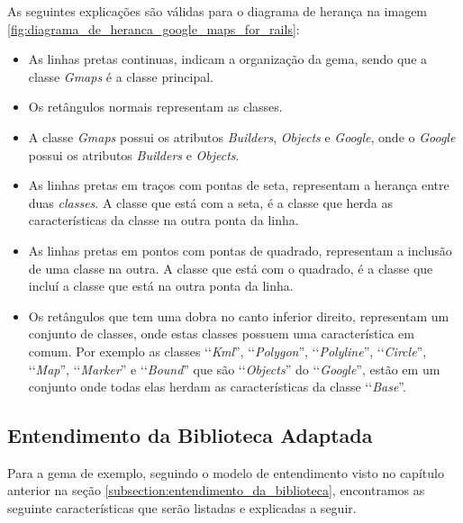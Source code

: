 As seguintes explicações são válidas para o diagrama de herança na imagem
\ref{fig:diagrama_de_heranca_google_maps_for_rails}:

\begin{itemize}

 \item As linhas pretas continuas, indicam a organização da gema, sendo que a classe \emph{Gmaps}
 é a classe principal.

 \item Os retângulos normais representam as classes.

 \item A classe \emph{Gmaps} possui os atributos \emph{Builders}, \emph{Objects} e
 \emph{Google}, onde o \emph{Google} possui os atributos \emph{Builders} e \emph{Objects}.

 \item As linhas pretas em traços com pontas de seta, representam a herança entre duas
 \emph{classes}. A classe que está com a seta, é a classe que herda as características da classe
 na outra ponta da linha.

 \item As linhas pretas em pontos com pontas de quadrado, representam a inclusão de uma classe na outra.
 A classe que está com o quadrado, é a classe que incluí a classe que está na outra ponta da linha.

  \item Os retângulos que tem uma dobra no canto inferior direito, representam um conjunto de classes,
 onde estas classes possuem uma característica em comum. Por exemplo as classes ‘‘\emph{Kml}'',
 ‘‘\emph{Polygon}'', ‘‘\emph{Polyline}'', ‘‘\emph{Circle}'', ‘‘\emph{Map}'', ‘‘\emph{Marker}'' e
 ‘‘\emph{Bound}'' que são ‘‘\emph{Objects}'' do ‘‘\emph{Google}'', estão em um conjunto onde todas elas
 herdam as características da classe ‘‘\emph{Base}''.

 \end{itemize}


\subsection{Entendimento da Biblioteca Adaptada}
\label{subsection:entendimento_da_biblioteca_adaptada}


Para a gema de exemplo, seguindo o modelo de entendimento visto no capítulo anterior na seção
\ref{subsection:entendimento_da_biblioteca}, encontramos as seguinte características que serão
listadas e explicadas a seguir.

